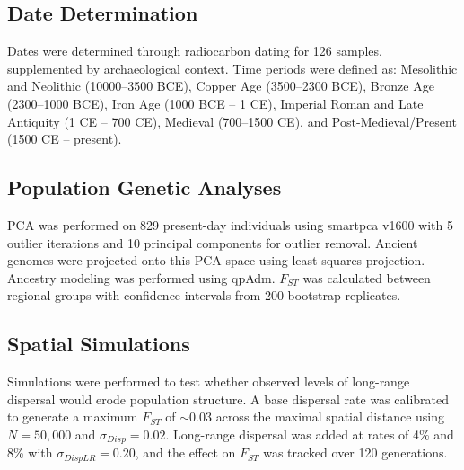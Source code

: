 \documentclass[11pt]{article}
\begin{document}
\subsection{Date Determination}

Dates were determined through radiocarbon dating for 126 samples, supplemented by archaeological context. Time periods were defined as: Mesolithic and Neolithic (10000--3500 BCE), Copper Age (3500--2300 BCE), Bronze Age (2300--1000 BCE), Iron Age (1000 BCE -- 1 CE), Imperial Roman and Late Antiquity (1 CE -- 700 CE), Medieval (700--1500 CE), and Post-Medieval/Present (1500 CE -- present).

\subsection{Population Genetic Analyses}

PCA was performed on 829 present-day individuals using smartpca v1600 with 5 outlier iterations and 10 principal components for outlier removal. Ancient genomes were projected onto this PCA space using least-squares projection. Ancestry modeling was performed using qpAdm. $F_{ST}$ was calculated between regional groups with confidence intervals from 200 bootstrap replicates.

\subsection{Spatial Simulations}

Simulations were performed to test whether observed levels of long-range dispersal would erode population structure. A base dispersal rate was calibrated to generate a maximum $F_{ST}$ of $\sim$0.03 across the maximal spatial distance using $N = 50{,}000$ and $\sigma_{Disp} = 0.02$. Long-range dispersal was added at rates of 4\% and 8\% with $\sigma_{DispLR} = 0.20$, and the effect on $F_{ST}$ was tracked over 120 generations.


\end{document}
